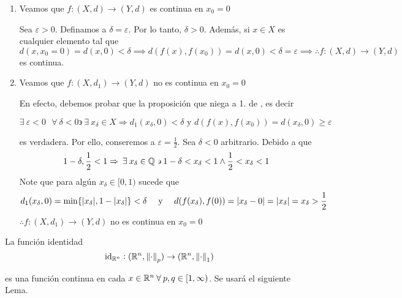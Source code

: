 \begin{proofexplanation}
\begin{enumerate}
    \item Veamos que $f:(X,d) \to (Y,d)$ es continua en $x_0 = 0$

    Sea $\varepsilon > 0$. Definamos a $\delta = \varepsilon$. Por lo tanto, $\delta > 0$. Además, si $x \in X$ es cualquier elemento tal que $d(x,x_0=0) = d(x,0) < \delta \implies d(f(x),f(x_0))=d(x,0) < \delta = \varepsilon \implies \therefore f:(X,d) \to (Y,d)$ es continua.
    
    \item Veamos que $f:(X,{d}_{1}) \to (Y,d)$ no es continua en $x_0 = 0$

    En efecto, debemos probar que la proposición que niega a 1. de , es decir

    \begin{equation*}
        \exists \: \varepsilon < 0 \: \: \: \forall \: \delta < 0 \backepsilon \: \exists \: {x}_{\delta} \in X \Rightarrow  {d}_{1}({x}_{\delta},0) < \delta \text{ y } d(f(x),f({x}_{0})) = d({x}_{\delta}, 0 ) \geqslant \varepsilon 
    \end{equation*}

    es verdadera. Por ello, conseremos a $\varepsilon = \frac{1}{2}$. Sea $\delta < 0 $ arbitrario. Debido a que 
    \begin{equation*}
        1 - \delta,  \frac{1}{2} < 1 \Rightarrow \: \exists \: {x}_{\delta} \in \mathbb{Q} \backepsilon 1 - \delta < {x}_{\delta} < 1 \wedge \frac{1}{2} < {x}_{\delta} < 1
    \end{equation*}
    Note que para algún $x_\delta \in [0,1)$ sucede que
    \begin{align*}
        {d}_{1}({x}_{\delta},0) = \min \{ \abs{{x}_{\delta}}, 1 - \abs{{x}_{\delta}}\} < \delta && \text{ y }&& d(f({x}_{\delta}),f(0)) = \abs{{x}_{\delta} - 0} = \abs{{x}_{\delta}} = {x}_{\delta} > \frac{1}{2}
    \end{align*}
    $\therefore f:(X,{d}_{1}) \to (Y,d)$ no es continua en $x_0 = 0$
    \end{enumerate} 
\end{proofexplanation}

\begin{eg}
    La función identidad 
    \begin{equation*}
        {\mathrm{id}}_{\mathbb{R}^n} : (\mathbb{R}^n, {\norm{\cdot}}_{p}) \to (\mathbb{R}^n, {\norm{\cdot}}_{1})
    \end{equation*}

    es una función continua en cada $x \in \mathbb{R}^n \: \forall \: p,q \in [1,\infty)$. Se usará el siguiente Lema.
\end{eg}

